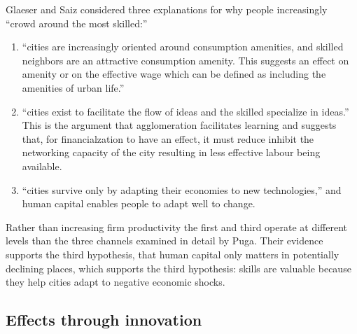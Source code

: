 Glaeser and Saiz \cite{glaeserRiseSkilledCity2003} considered three explanations for why people increasingly ``crowd around the most skilled:'' 
\begin {enumerate} 
\item ``cities are increasingly oriented around consumption amenities, and skilled neighbors are an attractive consumption amenity. This suggests an effect on amenity or on the effective wage which can be defined as  including the  amenities of urban life.'' 
\item  ``cities exist to facilitate the flow of ideas and the skilled specialize in ideas.'' This is the argument that agglomeration facilitates learning and suggests that, for financialzation to have an effect, it must reduce inhibit the networking capacity of  the city resulting in less effective labour being available.
\item ``cities survive only by adapting their economies to new technologies,'' and human capital enables people to adapt well to change. 
\end{enumerate}
Rather than increasing firm productivity the first and third operate at  different levels than the three channels examined in detail by Puga. 
Their evidence supports the third hypothesis, that human capital only matters in potentially declining places, which  supports the third hypothesis: skills are valuable because they help cities adapt  to negative economic shocks. 


\subsection{Effects through innovation}








